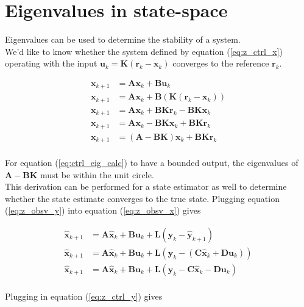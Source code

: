 \documentclass[10pt,conference,compsoc]{IEEEtran}
\newcommand{\mtx}[1] {\bm #1}
\begin{document}
\section{Eigenvalues in state-space}

Eigenvalues can be used to determine the stability of a \gls{system}. \\

We'd like to know whether the \gls{system} defined by equation
(\ref{eq:z_ctrl_x}) operating with the input
$\mtx{u}_k = \mtx{K}(\mtx{r}_k - \mtx{x}_k)$ converges to the \gls{reference}
$\mtx{r}_k$.

\begin{align}
  \mtx{x}_{k+1} &= \mtx{A}\mtx{x}_k + \mtx{B}\mtx{u}_k \nonumber \\
  \mtx{x}_{k+1} &= \mtx{A}\mtx{x}_k + \mtx{B}(\mtx{K}(\mtx{r}_k - \mtx{x}_k))
    \nonumber \\
  \mtx{x}_{k+1} &= \mtx{A}\mtx{x}_k + \mtx{B}\mtx{K}\mtx{r}_k -
    \mtx{B}\mtx{K}\mtx{x}_k \nonumber \\
  \mtx{x}_{k+1} &= \mtx{A}\mtx{x}_k - \mtx{B}\mtx{K}\mtx{x}_k +
    \mtx{B}\mtx{K}\mtx{r}_k \nonumber \\
  \mtx{x}_{k+1} &= (\mtx{A} - \mtx{B}\mtx{K})\mtx{x}_k +
    \mtx{B}\mtx{K}\mtx{r}_k \label{eq:ctrl_eig_calc}
\end{align}
\\
For equation (\ref{eq:ctrl_eig_calc}) to have a bounded output, the eigenvalues
of $\mtx{A} - \mtx{B}\mtx{K}$ must be within the unit circle. \\

This derivation can be performed for a \gls{state} estimator as well to
determine whether the \gls{state} estimate converges to the true \gls{state}.
Plugging equation (\ref{eq:z_obsv_y}) into equation (\ref{eq:z_obsv_x}) gives

\begin{align*}
  \hat{\mtx{x}}_{k+1} &= \mtx{A}\hat{\mtx{x}}_k + \mtx{B}\mtx{u}_k +
    \mtx{L} (\mtx{y}_k - \hat{\mtx{y}}_{k+1}) \\
  \hat{\mtx{x}}_{k+1} &= \mtx{A}\hat{\mtx{x}}_k + \mtx{B}\mtx{u}_k +
    \mtx{L} (\mtx{y}_k - (\mtx{C}\hat{\mtx{x}}_k + \mtx{D}\mtx{u}_k)) \\
  \hat{\mtx{x}}_{k+1} &= \mtx{A}\hat{\mtx{x}}_k + \mtx{B}\mtx{u}_k +
    \mtx{L} (\mtx{y}_k - \mtx{C}\hat{\mtx{x}}_k - \mtx{D}\mtx{u}_k) \\
\end{align*}

Plugging in equation (\ref{eq:z_ctrl_y}) gives
\end{document}
